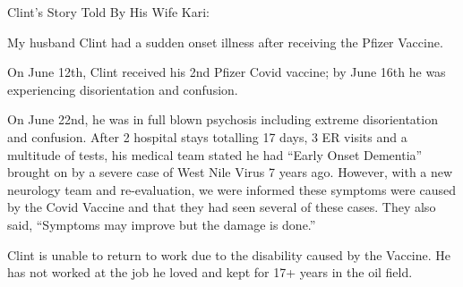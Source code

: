 Clint’s Story Told By His Wife Kari:

My husband Clint had a sudden onset illness after receiving the Pfizer Vaccine.

On June 12th, Clint received his 2nd Pfizer Covid vaccine; by June 16th he was
experiencing disorientation and confusion.

On June 22nd, he was in full blown psychosis including extreme disorientation
and confusion. After 2 hospital stays totalling 17 days, 3 ER visits and a
multitude of tests, his medical team stated he had “Early Onset Dementia”
brought on by a severe case of West Nile Virus 7 years ago. However, with a new
neurology team and re-evaluation, we were informed these symptoms were caused by
the Covid Vaccine and that they had seen several of these cases. They also said,
“Symptoms may improve but the damage is done.”

Clint is unable to return to work due to the disability caused by the
Vaccine. He has not worked at the job he loved and kept for 17+ years in the oil
field.

